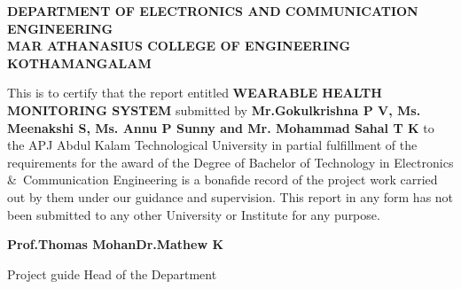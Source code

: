 \documentclass[12pt,a4paper]{report}
\date{}
\title{{\bf \Large WEARABLE HEALTH MONITORING SYSTEM  }\\    
\vspace{0.2cm}
{\normalsize {A PROJECT REPORT}}\\
\vspace{0.2cm}
{\normalsize{ submitted by}}\\
\vspace{0.20 cm}
{\normalsize\textbf{GOKULKRISHNA P V}} \\
\normalsize {Reg. No :\textbf{ MAC15EC059}}\\
\vspace{0.20 cm}
{\normalsize\textbf{MEENAKSHI S}} \\
\normalsize {Reg. No :\textbf{ MAC15EC080}}\\
\vspace{0.20 cm}
{\normalsize\textbf{ANNU P SUNNY}} \\
\normalsize {Reg. No :\textbf{ MAC15EC023}}\\
\vspace{0.20 cm}
\normalsize {\textbf{ MOHAMMAD SAHAL T K}}\\
\normalsize {Reg. No :\textbf{ MAC15EC086}}\\
\vspace{0.20 cm}
\normalsize{to}\\ 
\vspace{0.4cm}
\normalsize {the APJ Abdul Kalam Technological University}\\
\normalsize {in partial fulfillment of the requirements for the award of the Degree}\\
\vspace{0.4cm}
\normalsize {of}\\
\vspace{0.4cm}  
\normalsize {Bachelor of Technology}\\  
\normalsize {in} \\
\normalsize {\emph{  Electronics and Communication Engineering} }\\
\begin{figure}[H]
\centering
\texttt{[image: ma]}
\end{figure}
{\large \textbf {Department of  Electronics and Communication Engineering}}\\
\vspace{0.4cm}
\normalsize {Mar Athanasius College of Engineering}\\
\normalsize {Kothamangalam, Kerala, India 686 666}\\
\vspace{0.4cm}
\author \large {MAY 2019}}
\begin{document}
\newpage
\maketitle
\begin{center}
{\large \bf{DEPARTMENT OF ELECTRONICS AND COMMUNICATION ENGINEERING}}\\
{\large \bf{MAR ATHANASIUS COLLEGE OF ENGINEERING}}\\
{\large \bf{KOTHAMANGALAM}}
\end{center}

\onehalfspacing This is to certify that the report entitled {\large{ \textbf{WEARABLE HEALTH MONITORING SYSTEM  }}} submitted by \textbf{Mr.Gokulkrishna P V, Ms. Meenakshi S, Ms. Annu P Sunny and Mr. Mohammad Sahal T K} to the APJ Abdul Kalam Technological University in partial fulfillment of the requirements for the award of the Degree of Bachelor of Technology in  Electronics \&\ Communication Engineering is a bonafide record of the project work carried out by them under our guidance and supervision. This report in any form has not been submitted to any other University or Institute for any purpose.
\vspace{0.8in}
\begin{flushleft}
{\large{\textbf{Prof.Thomas Mohan}}}\hfill{\large {\textbf{Dr.Mathew K}}}
\end{flushleft}

\begin{flushleft}
Project guide                               \hfill{Head of the Department}
\end{flushleft}
 
\end{document}
